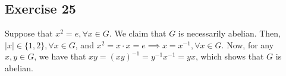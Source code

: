 \subsection*{Exercise 25}
Suppose that $x^2 = e, \forall x \in G$. We claim that $G$ is necessarily abelian. Then, $|x| \in \{1,2\}, \forall x \in G$, and $x^2 = x\cdot x = e \implies x = x^{-1}, \forall x \in G$. Now, for any $x, y \in G$, we have that $xy = (xy)^{-1} = y^{-1}x^{-1} = yx$, which shows that $G$ is abelian.
